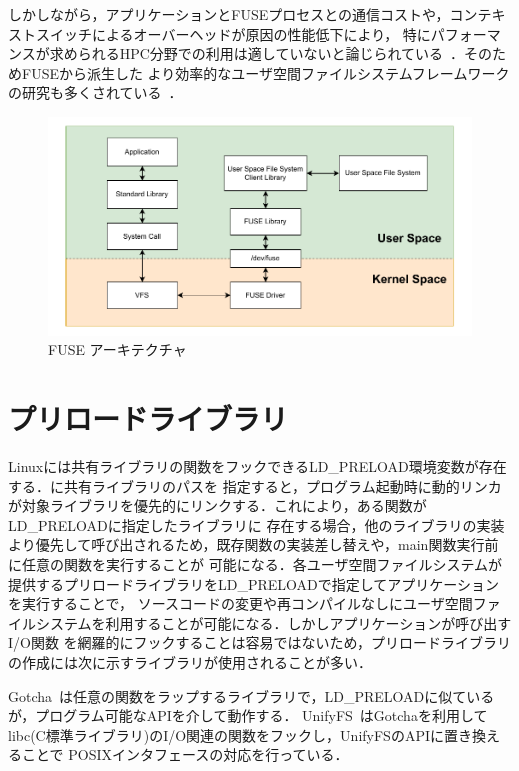 \documentclass[a4paper，11pt]{jreport}
\begin{document}
しかしながら，アプリケーションとFUSEプロセスとの通信コストや，コンテキストスイッチによるオーバーヘッドが原因の性能低下により，
特にパフォーマンスが求められるHPC分野での利用は適していないと論じられている~\cite{brinkmann2020ad}．そのためFUSEから派生した
より効率的なユーザ空間ファイルシステムフレームワークの研究も多くされている~\cite{294791, zhu2018direct, 3494556}．

\newpage


\begin{figure}[h]
	\begin{minipage}[b]{1\columnwidth}
		\centering
		\includegraphics[width=0.9\linewidth]{./figure/FUSE.pdf}
		\caption{FUSE アーキテクチャ}
		\label{fig:FUSE}
	\end{minipage}
\end{figure}

\newpage


\section{プリロードライブラリ}
Linuxには共有ライブラリの関数をフックできるLD\_PRELOAD環境変数が存在する．に共有ライブラリのパスを
指定すると，プログラム起動時に動的リンカが対象ライブラリを優先的にリンクする．これにより，ある関数がLD\_PRELOADに指定したライブラリに
存在する場合，他のライブラリの実装より優先して呼び出されるため，既存関数の実装差し替えや，main関数実行前に任意の関数を実行することが
可能になる．各ユーザ空間ファイルシステムが提供するプリロードライブラリをLD\_PRELOADで指定してアプリケーションを実行することで，
ソースコードの変更や再コンパイルなしにユーザ空間ファイルシステムを利用することが可能になる．しかしアプリケーションが呼び出すI/O関数
を網羅的にフックすることは容易ではないため，プリロードライブラリの作成には次に示すライブラリが使用されることが多い．

Gotcha~\cite{gotcha}は任意の関数をラップするライブラリで，LD\_PRELOADに似ているが，プログラム可能なAPIを介して動作する．
UnifyFS~\cite{10177390}はGotchaを利用してlibc(C標準ライブラリ)のI/O関連の関数をフックし，UnifyFSのAPIに置き換えることで
POSIXインタフェースの対応を行っている．
\end{document}
